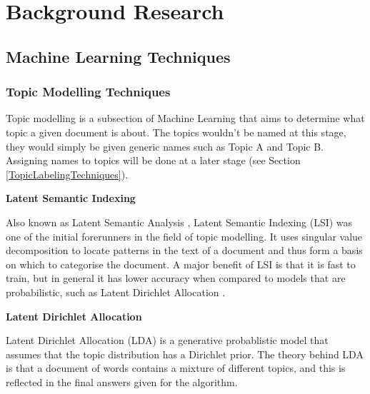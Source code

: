 \documentclass[12pt]{article}
\begin{document}

\pagebreak

\section{Background Research}

\subsection{Machine Learning Techniques}

\subsubsection{Topic Modelling Techniques}

\label{TopicModellingTechniques}

Topic modelling is a subsection of Machine Learning that aims to determine what topic a given document is about. The topics wouldn't be named at this stage, they would simply be given generic names such as Topic A and Topic B. Assigning names to topics will be done at a later stage (see Section \ref{TopicLabelingTechniques}).

\textbf{Latent Semantic Indexing}

Also known as Latent Semantic Analysis \cite{lsa}, Latent Semantic Indexing (LSI) was one of the initial forerunners in the field of topic modelling. It uses singular value decomposition to locate patterns in the text of a document and thus form a basis on which to categorise the document. A major benefit of LSI is that it is fast to train, but in general it has lower accuracy when compared to models that are probabilistic, such as Latent Dirichlet Allocation \cite{differenceBetweenLSIAndLDA}.

\textbf{Latent Dirichlet Allocation}

Latent Dirichlet Allocation (LDA) is a generative probablistic model that assumes that the topic distribution has a Dirichlet prior. The theory behind LDA is that a document of words contains a mixture of different topics, and this is reflected in the final answers given for the algorithm.
\end{document}
